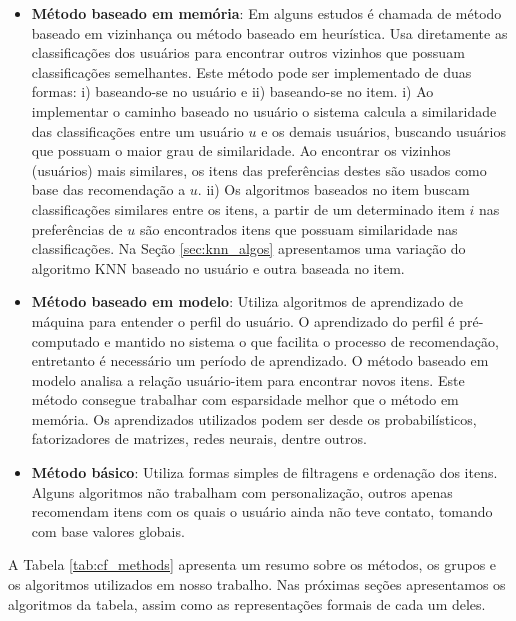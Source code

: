 \begin{itemize}
    \item \textbf{Método baseado em memória}: Em alguns estudos é chamada de método baseado em vizinhança ou método baseado em heurística. Usa diretamente as classificações dos usuários para encontrar outros vizinhos que possuam classificações semelhantes. Este método pode ser implementado de duas formas: i) baseando-se no usuário e ii) baseando-se no item. i) Ao implementar o caminho baseado no usuário o sistema calcula a similaridade das classificações entre um usuário $u$ e os demais usuários, buscando usuários que possuam o maior grau de similaridade. Ao encontrar os vizinhos (usuários) mais similares, os itens das preferências destes são usados como base das recomendação a $u$. ii) Os algoritmos baseados no item buscam classificações similares entre os itens, a partir de um determinado item $i$ nas preferências de $u$ são encontrados itens que possuam similaridade nas classificações. Na Seção \ref{sec:knn_algos} apresentamos uma variação do algoritmo \ac{KNN} baseado no usuário e outra baseada no item.
    
    \item \textbf{Método baseado em modelo}: Utiliza algoritmos de aprendizado de máquina para entender o perfil do usuário. O aprendizado do perfil é pré-computado e mantido no sistema o que facilita o processo de recomendação, entretanto é necessário um período de aprendizado. O método baseado em modelo analisa a relação usuário-item para encontrar novos itens. Este método consegue trabalhar com esparsidade melhor que o método em memória. Os aprendizados utilizados podem ser desde os probabilísticos, fatorizadores de matrizes, redes neurais, dentre outros.
    
    \item \textbf{Método básico}: Utiliza formas simples de filtragens e ordenação dos itens. Alguns algoritmos não trabalham com personalização, outros apenas recomendam itens com os quais o usuário ainda não teve contato, tomando com base valores globais.
\end{itemize}

A Tabela \ref{tab:cf_methods} apresenta um resumo sobre os métodos, os grupos e os algoritmos utilizados em nosso trabalho. Nas próximas seções apresentamos os algoritmos da tabela, assim como as representações formais de cada um deles.

